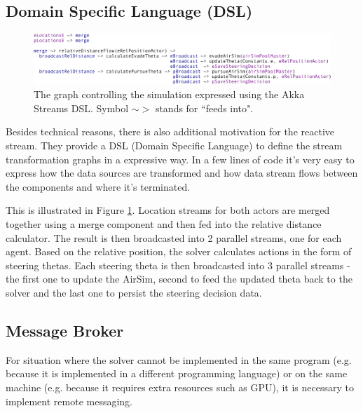 \documentclass{article}
\let\cite\citep
\begin{document}
\subsection{Domain Specific Language (DSL)}
\begin{figure}
	\centering
	\includegraphics[width=17.0cm]{streams-SDL}
	\caption{The graph controlling the simulation expressed using the Akka Streams DSL. Symbol $\sim$$>$ stands for ``feeds into".}\label{fig:streas-SDL}
\end{figure}

Besides technical reasons, there is also additional motivation for the reactive stream. They provide a DSL (Domain Specific Language) \cite{dsl-book} to define the stream transformation graphs in a expressive way. In a few lines of code it's very easy to express how the data sources are transformed and how data stream flows between the components and where it's terminated.

This is illustrated in Figure \ref{fig:streas-SDL}. Location streams for both actors are merged together using a merge component and then fed into the relative distance calculator. The result is then broadcasted into 2 parallel streams, one for each agent. Based on the relative position, the solver calculates actions in the form of steering thetas. Each steering theta is then broadcasted into 3 parallel streams - the first one to update the AirSim, second to feed the updated theta back to the solver and the last one to persist the steering decision data.









\subsection{Message Broker}
For situation where the solver cannot be implemented in the same program (e.g. because it is implemented in a different programming language) or on the same machine (e.g. because it requires extra resources such as GPU), it is necessary to implement remote messaging.
 
\end{document}
